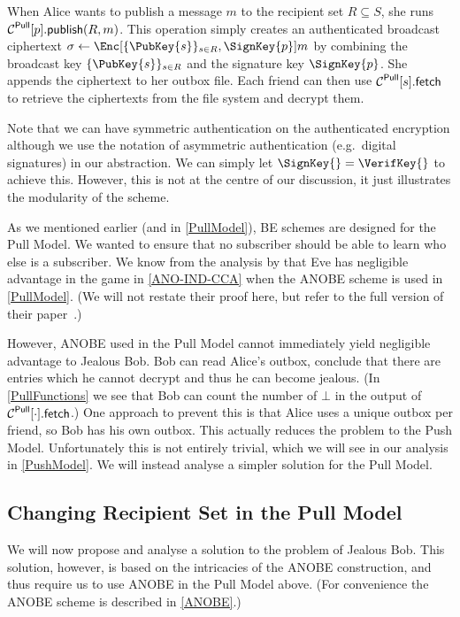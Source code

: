 When Alice wants to publish a message \(m\) to the recipient set \(R\subseteq 
  S\), she runs \(\ppub{p}[R][m]\).
This operation simply creates an authenticated broadcast ciphertext 
\(\sigma\gets \Enc[\{\PubKey{s}\}_{s\in R}, \SignKey{p}]{m}\) by combining the 
broadcast key \(\{\PubKey{s}\}_{s\in R}\) and the signature key 
\(\SignKey{p}\).
She appends the ciphertext to her outbox file.
Each friend can then use \(\pget{s}\) to retrieve the ciphertexts from the file 
system and decrypt them.

Note that we can have symmetric authentication on the authenticated encryption 
although we use the notation of asymmetric authentication (e.g.\ digital 
signatures) in our abstraction.
We can simply let \(\SignKey{} = \VerifKey{}\) to achieve this.
However, this is not at the centre of our discussion, it just illustrates the 
modularity of the scheme.

As we mentioned earlier (and in \cref{PullModel}), \ac{BE} schemes are designed 
for the Pull Model.
We wanted to ensure that no subscriber should be able to learn who else is 
a subscriber.
We know from the analysis by \citet{ANOBE} that Eve has negligible advantage in 
the game in \cref{ANO-IND-CCA} when the \ac{ANOBE} scheme is used in 
\cref{PullModel}.
(We will not restate their proof here, but refer to the full version of their 
paper~\cite{ANOBE}.)

However, \ac{ANOBE} used in the Pull Model cannot immediately yield negligible 
advantage to Jealous Bob.
Bob can read Alice's outbox, conclude that there are entries which he cannot 
decrypt and thus he can become jealous.
(In \cref{PullFunctions} we see that Bob can count the number of \(\bot\) in 
the output of \(\pget{\cdot}\).)
One approach to prevent this is that Alice uses a unique outbox per friend, so 
Bob has his own outbox.
This actually reduces the problem to the Push Model.
Unfortunately this is not entirely trivial, which we will see in our analysis 
in \cref{PushModel}.
We will instead analyse a simpler solution for the Pull Model.

\subsection{Changing Recipient Set in the Pull Model}
\label{ChangingPullRecipientSet}

We will now propose and analyse a solution to the problem of Jealous Bob.
This solution, however, is based on the intricacies of the \ac{ANOBE} 
construction, and thus require us to use \ac{ANOBE} in the Pull Model above.
(For convenience the \ac{ANOBE} scheme is described in \cref{ANOBE}.)

